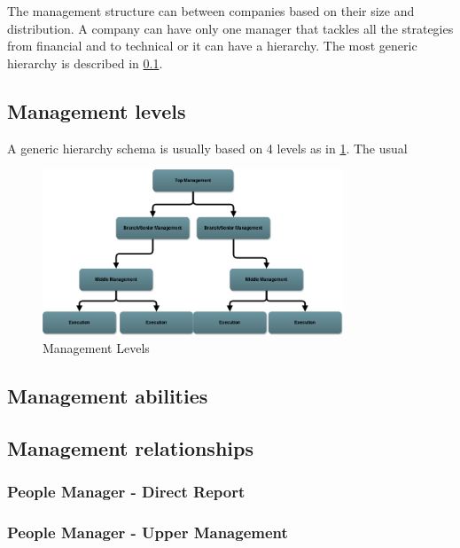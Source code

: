 The management structure can between companies based on their size and distribution. A company can have only one manager that tackles all the strategies from financial and to technical or it can have a hierarchy. 
The most generic hierarchy is described in \cref{sub-sec:levels}.
\subsection{Management levels}
\label{sub-sec:levels}
A generic hierarchy schema is usually based on 4 levels as in \cref{fig:levels}. The usual 
\begin{figure}[h]
\centering
\includegraphics[width=0.8\textwidth]{img/levels.png}
\caption{Management Levels}
\label{fig:levels}
\end{figure}

\subsection{Management abilities}
\subsection{Management relationships}
\label{sub-sec:relationships}

\subsubsection{People Manager - Direct Report}
\label{sub-sub-sec:pmdr}
 \newline

\subsubsection{People Manager - Upper Management}
\label{sub-sub-sec:pmum}
 \newline


